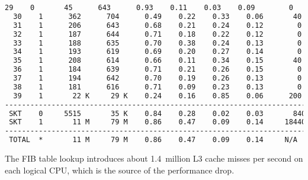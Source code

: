 \begin{lstlisting}[language=TeX]
  29    0       45      643      0.93    0.11    0.03    0.09        0
  30    1      362      704      0.49    0.22    0.33    0.06       40
  31    1      206      643      0.68    0.21    0.24    0.12        0
  32    1      187      644      0.71    0.18    0.22    0.12        0
  33    1      188      635      0.70    0.38    0.24    0.13        0
  34    1      193      619      0.69    0.20    0.27    0.14        0
  35    1      208      614      0.66    0.11    0.34    0.15       40
  36    1      184      639      0.71    0.21    0.26    0.15        0
  37    1      194      642      0.70    0.19    0.26    0.13        0
  38    1      181      616      0.71    0.09    0.23    0.13        0
  39    1       22 K     29 K    0.24    0.16    0.85    0.06      200
------------------------------------------------------------------------
 SKT    0     5515       35 K    0.84    0.28    0.02    0.03       840
 SKT    1       11 M     79 M    0.86    0.47    0.09    0.14     18440
------------------------------------------------------------------------
 TOTAL  *       11 M     79 M    0.86    0.47    0.09    0.14     N/A
\end{lstlisting}
The FIB table lookup introduces about 1.4~million L3 cache misses per second on each logical CPU,
which is the source of the performance drop.
